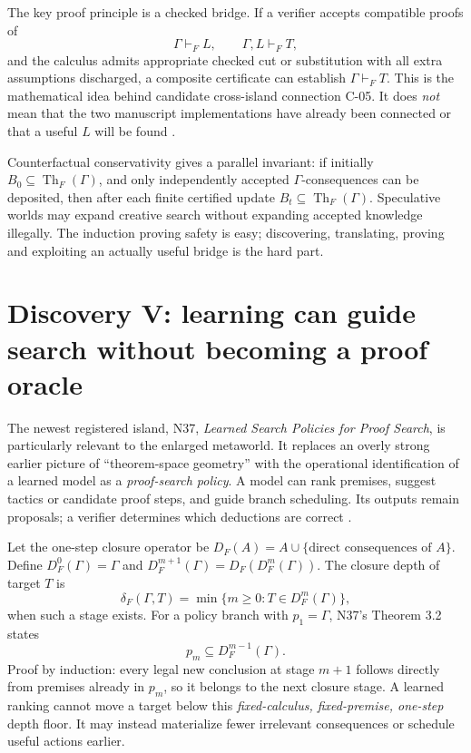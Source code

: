 \documentclass[11pt,letterpaper,oneside]{article}
\newcommand{\Th}{\operatorname{Th}}
\begin{document}
The key proof principle is a checked bridge. If a verifier accepts compatible proofs of
\[
\Gamma\vdash_F L,\qquad \Gamma,L\vdash_F T,
\]
and the calculus admits appropriate checked cut or substitution with all extra assumptions discharged, a composite certificate can establish $\Gamma\vdash_F T$. This is the mathematical idea behind candidate cross-island connection C-05. It does \emph{not} mean that the two manuscript implementations have already been connected or that a useful $L$ will be found \cite{checkpoint}.

Counterfactual conservativity gives a parallel invariant: if initially $B_0\subseteq\Th_F(\Gamma)$, and only independently accepted $\Gamma$-consequences can be deposited, then after each finite certified update $B_t\subseteq\Th_F(\Gamma)$. Speculative worlds may expand creative search without expanding accepted knowledge illegally. The induction proving safety is easy; discovering, translating, proving and exploiting an actually useful bridge is the hard part.

\section{Discovery V: learning can guide search without becoming a proof oracle}
The newest registered island, N37, \emph{Learned Search Policies for Proof Search}, is particularly relevant to the enlarged metaworld. It replaces an overly strong earlier picture of ``theorem-space geometry'' with the operational identification of a learned model as a \emph{proof-search policy}. A model can rank premises, suggest tactics or candidate proof steps, and guide branch scheduling. Its outputs remain proposals; a verifier determines which deductions are correct \cite{n37}.

Let the one-step closure operator be $D_F(A)=A\cup\{\text{direct consequences of }A\}$. Define $D_F^0(\Gamma)=\Gamma$ and $D_F^{m+1}(\Gamma)=D_F(D_F^m(\Gamma))$. The closure depth of target $T$ is
\[
 \delta_F(\Gamma,T)=\min\{m\ge 0:T\in D_F^m(\Gamma)\},
\]
when such a stage exists. For a policy branch with $p_1=\Gamma$, N37's Theorem 3.2 states
\[
\boxed{p_m\subseteq D_F^{m-1}(\Gamma).}
\]
Proof by induction: every legal new conclusion at stage $m+1$ follows directly from premises already in $p_m$, so it belongs to the next closure stage. A learned ranking cannot move a target below this \emph{fixed-calculus, fixed-premise, one-step} depth floor. It may instead materialize fewer irrelevant consequences or schedule useful actions earlier.
\end{document}
